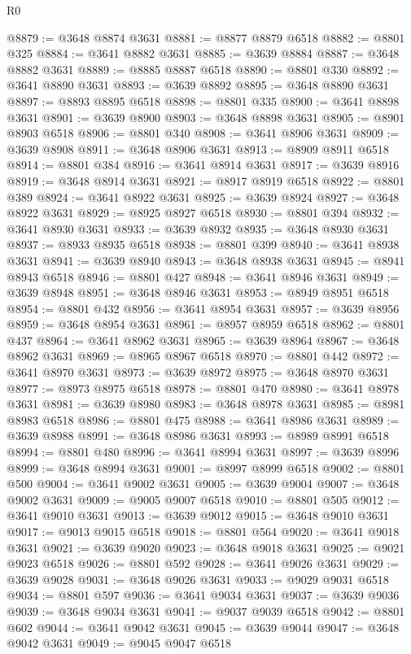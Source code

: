 \begin{lexlean}{R0}
\begin{coremodule}
@8879 := @3648 @8874 @3631
@8881 := @8877 @8879 @6518
@8882 := @8801 @325
@8884 := @3641 @8882 @3631
@8885 := @3639 @8884
@8887 := @3648 @8882 @3631
@8889 := @8885 @8887 @6518
@8890 := @8801 @330
@8892 := @3641 @8890 @3631
@8893 := @3639 @8892
@8895 := @3648 @8890 @3631
@8897 := @8893 @8895 @6518
@8898 := @8801 @335
@8900 := @3641 @8898 @3631
@8901 := @3639 @8900
@8903 := @3648 @8898 @3631
@8905 := @8901 @8903 @6518
@8906 := @8801 @340
@8908 := @3641 @8906 @3631
@8909 := @3639 @8908
@8911 := @3648 @8906 @3631
@8913 := @8909 @8911 @6518
@8914 := @8801 @384
@8916 := @3641 @8914 @3631
@8917 := @3639 @8916
@8919 := @3648 @8914 @3631
@8921 := @8917 @8919 @6518
@8922 := @8801 @389
@8924 := @3641 @8922 @3631
@8925 := @3639 @8924
@8927 := @3648 @8922 @3631
@8929 := @8925 @8927 @6518
@8930 := @8801 @394
@8932 := @3641 @8930 @3631
@8933 := @3639 @8932
@8935 := @3648 @8930 @3631
@8937 := @8933 @8935 @6518
@8938 := @8801 @399
@8940 := @3641 @8938 @3631
@8941 := @3639 @8940
@8943 := @3648 @8938 @3631
@8945 := @8941 @8943 @6518
@8946 := @8801 @427
@8948 := @3641 @8946 @3631
@8949 := @3639 @8948
@8951 := @3648 @8946 @3631
@8953 := @8949 @8951 @6518
@8954 := @8801 @432
@8956 := @3641 @8954 @3631
@8957 := @3639 @8956
@8959 := @3648 @8954 @3631
@8961 := @8957 @8959 @6518
@8962 := @8801 @437
@8964 := @3641 @8962 @3631
@8965 := @3639 @8964
@8967 := @3648 @8962 @3631
@8969 := @8965 @8967 @6518
@8970 := @8801 @442
@8972 := @3641 @8970 @3631
@8973 := @3639 @8972
@8975 := @3648 @8970 @3631
@8977 := @8973 @8975 @6518
@8978 := @8801 @470
@8980 := @3641 @8978 @3631
@8981 := @3639 @8980
@8983 := @3648 @8978 @3631
@8985 := @8981 @8983 @6518
@8986 := @8801 @475
@8988 := @3641 @8986 @3631
@8989 := @3639 @8988
@8991 := @3648 @8986 @3631
@8993 := @8989 @8991 @6518
@8994 := @8801 @480
@8996 := @3641 @8994 @3631
@8997 := @3639 @8996
@8999 := @3648 @8994 @3631
@9001 := @8997 @8999 @6518
@9002 := @8801 @500
@9004 := @3641 @9002 @3631
@9005 := @3639 @9004
@9007 := @3648 @9002 @3631
@9009 := @9005 @9007 @6518
@9010 := @8801 @505
@9012 := @3641 @9010 @3631
@9013 := @3639 @9012
@9015 := @3648 @9010 @3631
@9017 := @9013 @9015 @6518
@9018 := @8801 @564
@9020 := @3641 @9018 @3631
@9021 := @3639 @9020
@9023 := @3648 @9018 @3631
@9025 := @9021 @9023 @6518
@9026 := @8801 @592
@9028 := @3641 @9026 @3631
@9029 := @3639 @9028
@9031 := @3648 @9026 @3631
@9033 := @9029 @9031 @6518
@9034 := @8801 @597
@9036 := @3641 @9034 @3631
@9037 := @3639 @9036
@9039 := @3648 @9034 @3631
@9041 := @9037 @9039 @6518
@9042 := @8801 @602
@9044 := @3641 @9042 @3631
@9045 := @3639 @9044
@9047 := @3648 @9042 @3631
@9049 := @9045 @9047 @6518

\end{coremodule}
\end{lexlean}
